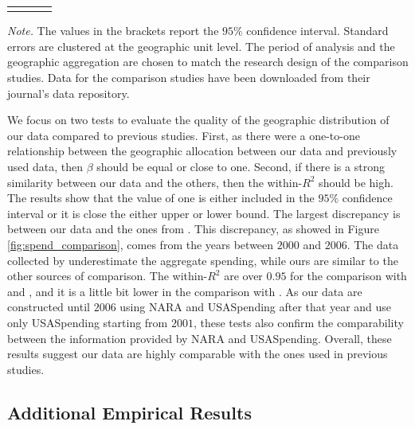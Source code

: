 \documentclass[dv_diss_main.tex]{subfiles}
\begin{document}
\begin{table}[!ht]
\begin{center}
{\begin{tabular}{l ccc}
    \vspace{-2pt} & \vspace{-2pt} & \vspace{-2pt} & \vspace{-2pt} \\
    

\end{tabular}
}
    
    
\end{center}
\footnotesize{\textit{Note. } The values in the brackets report the $95\%$ confidence interval. Standard errors are clustered at the geographic unit level. The period of analysis and the geographic aggregation are chosen to match the research design of the comparison studies. Data for the comparison studies have been downloaded from their journal's data repository.}
\end{table} 


We focus on two tests to evaluate the quality of the geographic distribution of our data compared to previous studies. First, as there were a one-to-one relationship between the geographic allocation between our data and previously used data, then $\beta$ should be equal or close to one. Second, if there is a strong similarity between our data and the others, then the within-$R^{2}$ should be high. The results show that the value of one is either included in the $95\%$ confidence interval or it is close the either upper or lower bound. The largest discrepancy is between our data and the ones from \cite{Nakamura2014}. This discrepancy, as showed in Figure \ref{fig:spend_comparison}, comes from the years between $2000$ and $2006$. The data collected by \cite{Nakamura2014} underestimate the aggregate spending, while ours are similar to the other sources of comparison. The within-$R^{2}$ are over $0.95$ for the comparison with \cite{Nakamura2014} and \cite{Dupor2017}, and it is a little bit lower in the comparison with \cite{Demyanyk2019}. As our data are constructed until $2006$ using NARA and USASpending after that year and \cite{Demyanyk2019} use only USASpending starting from $2001$, these tests also confirm the comparability between the information provided by NARA and USASpending. Overall, these results suggest our data are highly comparable with the ones used in previous studies.

\subsection{Additional Empirical Results}\label{sec:app_empres}
\end{document}
